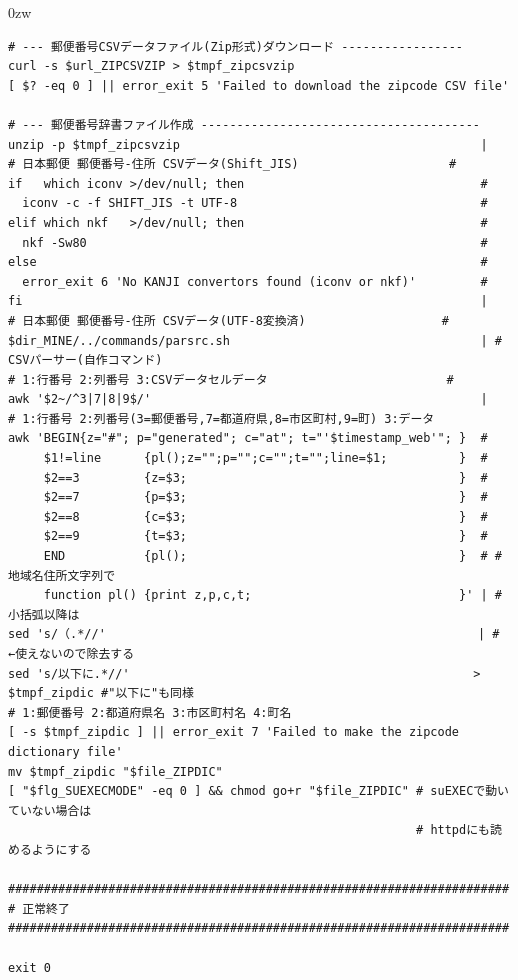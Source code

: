 \begin{indentation}{-9mm}{0zw}
\begin{verbatim}
# --- 郵便番号CSVデータファイル(Zip形式)ダウンロード -----------------
curl -s $url_ZIPCSVZIP > $tmpf_zipcsvzip
[ $? -eq 0 ] || error_exit 5 'Failed to download the zipcode CSV file'

# --- 郵便番号辞書ファイル作成 ---------------------------------------
unzip -p $tmpf_zipcsvzip                                          |
# 日本郵便 郵便番号-住所 CSVデータ(Shift_JIS)                     #
if   which iconv >/dev/null; then                                 #
  iconv -c -f SHIFT_JIS -t UTF-8                                  #
elif which nkf   >/dev/null; then                                 #
  nkf -Sw80                                                       #
else                                                              #
  error_exit 6 'No KANJI convertors found (iconv or nkf)'         #
fi                                                                |
# 日本郵便 郵便番号-住所 CSVデータ(UTF-8変換済)                   #
$dir_MINE/../commands/parsrc.sh                                   | # CSVパーサー(自作コマンド)
# 1:行番号 2:列番号 3:CSVデータセルデータ                         #
awk '$2~/^3|7|8|9$/'                                              |
# 1:行番号 2:列番号(3=郵便番号,7=都道府県,8=市区町村,9=町) 3:データ
awk 'BEGIN{z="#"; p="generated"; c="at"; t="'$timestamp_web'"; }  #
     $1!=line      {pl();z="";p="";c="";t="";line=$1;          }  #
     $2==3         {z=$3;                                      }  #
     $2==7         {p=$3;                                      }  #
     $2==8         {c=$3;                                      }  #
     $2==9         {t=$3;                                      }  #
     END           {pl();                                      }  # #   地域名住所文字列で
     function pl() {print z,p,c,t;                             }' | #   小括弧以降は
sed 's/（.*//'                                                    | # ←使えないので除去する
sed 's/以下に.*//'                                                > $tmpf_zipdic #"以下に"も同様
# 1:郵便番号 2:都道府県名 3:市区町村名 4:町名
[ -s $tmpf_zipdic ] || error_exit 7 'Failed to make the zipcode dictionary file'
mv $tmpf_zipdic "$file_ZIPDIC"
[ "$flg_SUEXECMODE" -eq 0 ] && chmod go+r "$file_ZIPDIC" # suEXECで動いていない場合は
                                                         # httpdにも読めるようにする

######################################################################
# 正常終了
######################################################################

exit 0
\end{verbatim}
\end{indentation}


